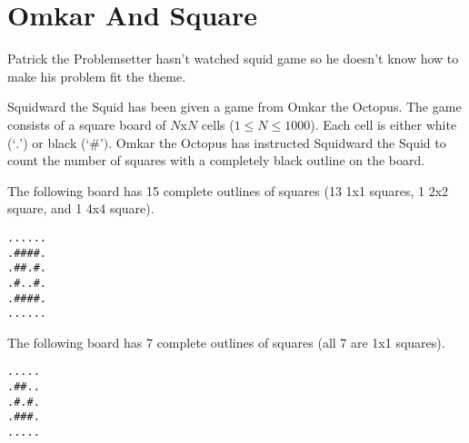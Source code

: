 \documentclass{article}
\begin{document}
\section{Omkar And Square}

Patrick the Problemsetter hasn't watched squid game so he doesn't know how to make his problem fit the theme. 

Squidward the Squid has been given a game from Omkar the Octopus. The game consists of a square board of $N$x$N$ cells ($1 \le N \le 1000$). Each cell is either white ($\textbf{`.'}$) or black ($\textbf{`\#')}$. Omkar the Octopus has instructed Squidward the Squid to count the number of squares with a completely black outline on the board.

The following board has 15 complete outlines of squares (13 1x1 squares, 1 2x2 square, and 1 4x4 square).

\begin{center}
\begin{varwidth}{\linewidth}
\begin{verbatim}
......
.####.
.##.#.
.#..#.
.####.
......
\end{verbatim}
\end{varwidth}
\end{center}

The following board has 7 complete outlines of squares (all 7 are 1x1 squares).

\begin{center}
\begin{varwidth}{\linewidth}
\begin{verbatim}
.....
.##..
.#.#.
.###.
.....
\end{verbatim}
\end{varwidth}
\end{center}
\end{document}
